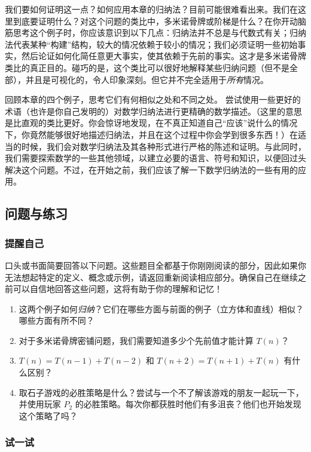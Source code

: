 我们要如何证明这一点？如何应用本章的归纳法？目前可能很难看出来。我们在这里到底要证明什么？对这个问题的类比中，多米诺骨牌或阶梯是什么？在你开动脑筋思考这个例子时，你应该意识到以下几点：归纳法并不总是与代数式有关；归纳法代表某种``构建''结构，较大的情况依赖于较小的情况；我们必须证明一些初始事实，然后论证如何化简任意更大事实，使其依赖于先前的事实。这才是多米诺骨牌类比的真正目的。碰巧的是，这个类比可以很好地解释某些归纳问题（但不是全部），并且是可视化的，令人印象深刻。但它并不完全适用于\textit{所有}情况。

回顾本章的四个例子，思考它们有何相似之处和不同之处。 尝试使用一些更好的术语（也许是你自己发明的）对数学归纳法进行更精确的数学描述。（这里的意思是比直观的类比更好。你会惊讶地发现，在不真正知道自己``应该''说什么的情况下，你竟然能够很好地描述归纳法，并且在这个过程中你会学到很多东西！）在适当的时候，我们会对数学归纳法及其各种形式进行严格的陈述和证明。与此同时，我们需要探索数学的一些其他领域，以建立必要的语言、符号和知识，以便回过头解决这个问题。不过，在开始之前，我们应该了解一下数学归纳法的一些有用的应用。

\subsection{问题与练习}

\subsubsection*{提醒自己}

口头或书面简要回答以下问题。这些题目全都基于你刚刚阅读的部分，因此如果你无法想起特定的定义、概念或示例，请返回重新阅读相应部分。确保自己在继续之前可以自信地回答这些问题，这将有助于你的理解和记忆！

\begin{enumerate}[label=(\arabic*)]
    \item 这两个例子如何\textit{归纳}？它们在哪些方面与前面的例子（立方体和直线）相似？哪些方面有所不同？
    \item 对于多米诺骨牌密铺问题，我们需要知道多少个先前值才能计算 $T(n)$？
    \item $T(n) = T(n - 1) + T(n - 2)$ 和 $T(n + 2) = T(n + 1) + T(n)$ 有什么区别？
    \item 取石子游戏的必胜策略是什么？尝试与一个不了解该游戏的朋友一起玩一下，并使用玩家 $P_2$ 的必胜策略。每次你都获胜时他们有多沮丧？他们也开始发现这个策略了吗？
\end{enumerate}

\subsubsection*{试一试}

